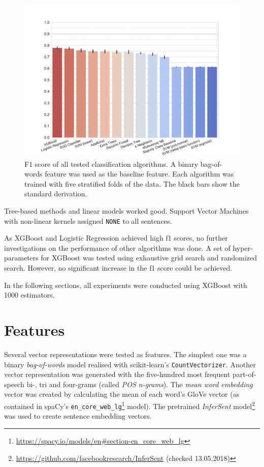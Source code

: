 \begin{figure}[tb]
\centering
\caption{F1 score of all tested classification algorithms. A binary bag-of-words feature was used as the baseline feature. Each algorithm was trained with five stratified folds of the data. The black bars show the standard derivation.}
\label{tbl:algo}
\includegraphics[width=1\linewidth]{images/classifier}
\end{figure}


Tree-based methods and linear models worked good. Support Vector Machines with non-linear kernels assigned \texttt{NONE} to all sentences.

As XGBoost and Logistic Regression achieved high f1 scores, no further investigations on the performance of other algorithms was done. A set of hyper-parameters for XGBoost was tested using exhaustive grid search and randomized search. However, no significant increase in the f1 score could be achieved.

In the following sections, all experiments were conducted using XGBoost with 1000 estimators.


\section{Features}
\label{sec:features}
Several vector representations were tested as features. The simplest one was a binary \emph{bag-of-words} model realised with scikit-learn's \texttt{CountVectorizer}. Another vector representation was generated with the five-hundred most frequent part-of-speech bi-, tri and four-grams (called \emph{POS n-grams}). The \emph{mean word embedding} vector was created by calculating the mean of each word's GloVe vector (as contained in spaCy's \texttt{en\_core\_web\_lg}\footnote{\url{https://spacy.io/models/en\#section-en\_core\_web\_lg}} model). The pretrained \emph{InferSent} model\footnote{\url{https://github.com/facebookresearch/InferSent} (checked 13.05.2018)} was used to create sentence embedding vectors.

